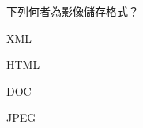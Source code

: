 \ifx\ntpcNinetyTwo\undefined[92學年基北區] \fi
下列何者為影像儲存格式？
  \begin{optionlist}
  \item XML
  \item HTML
  \item DOC
  \item JPEG\label{ntpc-92-a8}
  \end{optionlist}